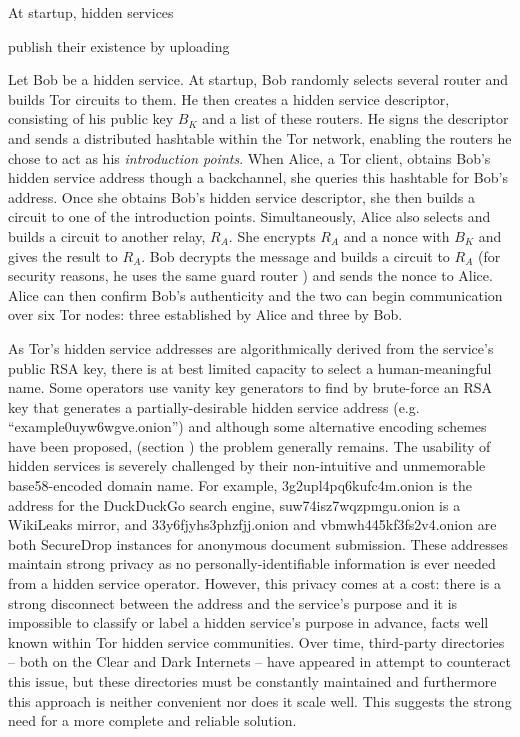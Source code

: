 \documentclass{sig-alternate}
\begin{document}
At startup, hidden services 


publish their existence by uploading 


\cite{bauer2007low}\cite{overlier2006locating}

Let Bob be a hidden service. At startup, Bob randomly selects several router and builds Tor circuits to them. He then creates a hidden service descriptor, consisting of his public key $ B_{K} $ and a list of these routers. He signs the descriptor and sends a distributed hashtable within the Tor network, enabling the routers he chose to act as his \textit{introduction points}. When Alice, a Tor client, obtains Bob's hidden service address though a backchannel, she queries this hashtable for Bob's address. Once she obtains Bob's hidden service descriptor, she then builds a circuit to one of the introduction points. Simultaneously, Alice also selects and builds a circuit to another relay, $ R_{A} $. She encrypts $ R_{A} $ and a nonce with $ B_{K} $ and gives the result to $ R_{A} $. Bob decrypts the message and builds a circuit to $ R_{A} $ (for security reasons, he uses the same guard router ) and sends the nonce to Alice. Alice can then confirm Bob's authenticity and the two can begin communication over six Tor nodes: three established by Alice and three by Bob.


As Tor's hidden service addresses are algorithmically derived from the service's public RSA key, there is at best limited capacity to select a human-meaningful name. Some operators use vanity key generators to find by brute-force an RSA key that generates a partially-desirable hidden service address (e.g. ``example0uyw6wgve.onion'') and although some alternative encoding schemes have been proposed, (section \label{sec:EncodingSchemes}) the problem generally remains. The usability of hidden services is severely challenged by their non-intuitive and unmemorable base58-encoded domain name. For example, 3g2upl4pq6kufc4m.onion is the address for the DuckDuckGo search engine, suw74isz7wqzpmgu.onion is a WikiLeaks mirror, and 33y6fjyhs3phzfjj.onion and vbmwh445kf3fs2v4.onion are both SecureDrop instances for anonymous document submission. These addresses maintain strong privacy as no personally-identifiable information is ever needed from a hidden service operator. However, this privacy comes at a cost: there is a strong disconnect between the address and the service's purpose and it is impossible to classify or label a hidden service's purpose in advance, facts well known within Tor hidden service communities. Over time, third-party directories -- both on the Clear and Dark Internets -- have appeared in attempt to counteract this issue, but these directories must be constantly maintained and furthermore this approach is neither convenient nor does it scale well. This suggests the strong need for a more complete and reliable solution.
\end{document}
